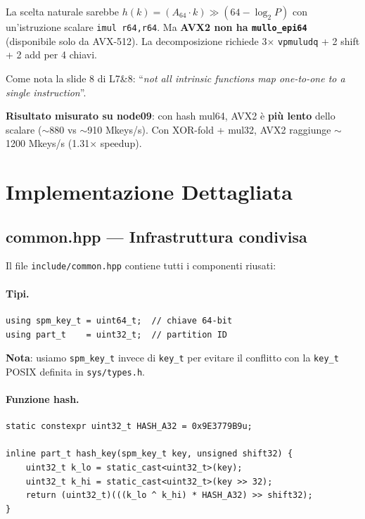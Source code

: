 \documentclass[11pt,a4paper]{article}
\begin{document}
\begin{warnbox}[title=\textbf{Perché non una hash a 64 bit?}]
La scelta naturale sarebbe $h(k) = (A_{64} \cdot k) \gg (64 - \log_2 P)$ con un'istruzione scalare \texttt{imul r64,r64}. Ma \textbf{AVX2 non ha \texttt{mullo\_epi64}} (disponibile solo da AVX-512). La decomposizione richiede 3$\times$ \texttt{vpmuludq} + 2 shift + 2 add per 4 chiavi.

Come nota la slide 8 di L7\&8: ``\textit{not all intrinsic functions map one-to-one to a single instruction}''.

\textbf{Risultato misurato su node09}: con hash mul64, AVX2 è \textbf{più lento} dello scalare ($\sim$880 vs $\sim$910 Mkeys/s). Con XOR-fold + mul32, AVX2 raggiunge $\sim$1200 Mkeys/s (1.31$\times$ speedup).
\end{warnbox}


\section{Implementazione Dettagliata}

\subsection{common.hpp --- Infrastruttura condivisa}

Il file \texttt{include/common.hpp} contiene tutti i componenti riusati:

\paragraph{Tipi.}
\begin{lstlisting}
using spm_key_t = uint64_t;  // chiave 64-bit
using part_t    = uint32_t;  // partition ID
\end{lstlisting}
\textbf{Nota}: usiamo \texttt{spm\_key\_t} invece di \texttt{key\_t} per evitare il conflitto con la \texttt{key\_t} POSIX definita in \texttt{sys/types.h}.

\paragraph{Funzione hash.}
\begin{lstlisting}
static constexpr uint32_t HASH_A32 = 0x9E3779B9u;

inline part_t hash_key(spm_key_t key, unsigned shift32) {
    uint32_t k_lo = static_cast<uint32_t>(key);
    uint32_t k_hi = static_cast<uint32_t>(key >> 32);
    return (uint32_t)(((k_lo ^ k_hi) * HASH_A32) >> shift32);
}
\end{lstlisting}
\end{document}
